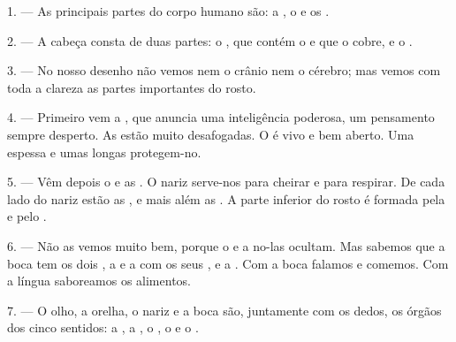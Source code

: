 %

\VUsaut{4.0mm}
\VUsaut{2.0mm}

\VUsaut{2.4mm}
\VUsaut{3.0mm}

1. --- As principais partes do corpo humano são: a , o
 e os .

\VUsaut{3.0mm}

2. --- A cabeça consta de duas partes: o , que contém o
 e que o  cobre, e o .

3. --- No nosso desenho não vemos nem o crânio nem o cérebro; mas vemos
com toda a clareza as partes importantes do rosto.

4. --- Primeiro vem a , que anuncia uma inteligência
poderosa, um pensamento sempre desperto. As  estão muito
desafogadas. O  é vivo e bem aberto. Uma 
espessa e umas  longas protegem-no.

5. --- Vêm depois o  e as . O nariz serve-nos
para cheirar e para respirar. De cada lado do nariz estão as
, e mais além as . A parte inferior do rosto é
formada pela  e pelo .

6. --- Não as vemos muito bem, porque o  e a 
no-las ocultam. Mas sabemos que a boca tem os dois , a
 e a  com os seus
, e a . Com a boca falamos e comemos. Com a
língua saboreamos os alimentos.

7. --- O olho, a orelha, o nariz e a boca são, juntamente com os dedos,
os órgãos dos cinco sentidos: a , a , o
, o  e o .

